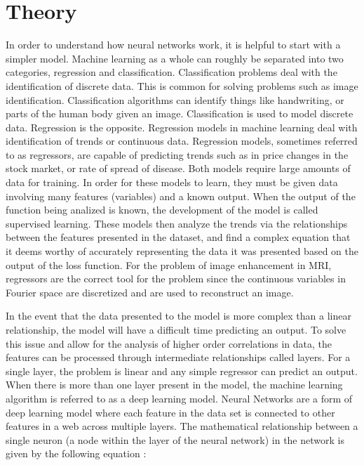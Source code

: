 \documentclass[14pt]{extreport}
\begin{document}
    \section*{Theory}
        In order to understand how neural networks work, it is helpful to start with a simpler model. Machine learning as a whole can roughly be separated into two categories, regression and classification. Classification problems deal with the identification of discrete data. This is common for solving problems such as image identification. Classification algorithms can identify things like handwriting, or parts of the human body given an image. Classification is used to model discrete data. Regression is the opposite. Regression models in machine learning deal with identification of trends or continuous data. Regression models, sometimes referred to as regressors, are capable of predicting trends such as in price changes in the stock market, or rate of spread of disease. Both models require large amounts of data for training. In order for these models to learn, they must be given data involving many features (variables) and a known output. When the output of the function being analized is known, the development of the model is called supervised learning. These models then analyze the trends via the relationships between the features presented in the dataset, and find a complex equation that it deems worthy of accurately representing the data it was presented based on the output of the loss function. For the problem of image enhancement in MRI, regressors are the correct tool for the problem since the continuous variables in Fourier space are discretized and are used to reconstruct an image.

        In the event that the data presented to the model is more complex than a linear relationship, the model will have a difficult time predicting an output\cite{Raschka_2022}. To solve this issue and allow for the analysis of higher order correlations in data, the features can be processed through intermediate relationships called layers. For a single layer, the problem is linear and any simple regressor can predict an output. When there is more than one layer present in the model, the machine learning algorithm is referred to as a deep learning model. Neural Networks are a form of deep learning model where each feature in the data set is connected to other features in a web across multiple layers. The mathematical relationship between a single neuron (a node within the layer of the neural network) in the network is given by the following equation \cite{Gazit_2024}:
        
\end{document}
